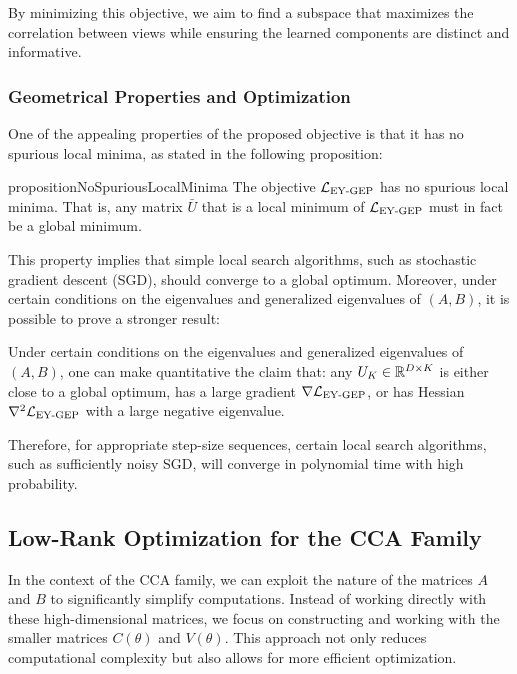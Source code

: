 By minimizing this objective, we aim to find a subspace that maximizes the correlation between views while ensuring the learned components are distinct and informative.

\subsubsection{Geometrical Properties and Optimization}
One of the appealing properties of the proposed objective is that it has no spurious local minima, as stated in the following proposition:
\begin{restatable}{proposition}{NoSpuriousLocalMinima}\label{prop:no-spurious}
The objective $\mathcal{L}_\text{EY-GEP}$ has no spurious local minima.
That is, any matrix $\bar{U}$ that is a local minimum of $\mathcal{L}_\text{EY-GEP}$ must in fact be a global minimum.
\end{restatable}
This property implies that simple local search algorithms, such as stochastic gradient descent (SGD), should converge to a global optimum. Moreover, under certain conditions on the eigenvalues and generalized eigenvalues of $(A,B)$, it is possible to prove a stronger result:
\begin{corollary}
    Under certain conditions on the eigenvalues and generalized eigenvalues of $(A,B)$, one can make quantitative the claim that:
    any $U_K \in \mathbb{R}^{D \times K}$ is either close to a global optimum, has a large gradient $\nabla \mathcal{L}_\text{EY-GEP}$, or has Hessian $\nabla^2 \mathcal{L}_\text{EY-GEP}$ with a large negative eigenvalue.
    
    Therefore, for appropriate step-size sequences, certain local search algorithms, such as sufficiently noisy SGD, will converge in polynomial time with high probability.
\end{corollary}

\subsection{Low-Rank Optimization for the CCA Family}

In the context of the CCA family, we can exploit the nature of the matrices \(A\) and \(B\) to significantly simplify computations. Instead of working directly with these high-dimensional matrices, we focus on constructing and working with the smaller matrices \(C(\theta)\) and \(V(\theta)\). This approach not only reduces computational complexity but also allows for more efficient optimization.

